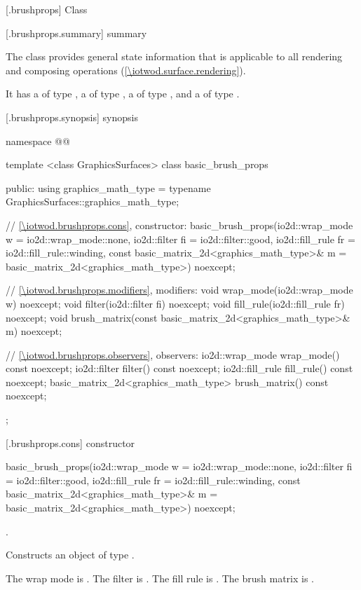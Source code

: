 
 [\iotwod.brushprops] {Class }

 [\iotwod.brushprops.summary] { summary}

\pnum
{}%
The  class provides general state information that is applicable to all rendering and composing operations (\ref{\iotwod.surface.rendering}).

\pnum
It has a  of type , a  of type , a  of type , and a  of type .

 [\iotwod.brushprops.synopsis] { synopsis}

\begin{codeblock}
namespace @\fullnamespace{}@ {
  template <class GraphicsSurfaces>
  class basic_brush_props {
    public:
    using graphics_math_type = typename GraphicsSurfaces::graphics_math_type;

    // \ref{\iotwod.brushprops.cons}, constructor:
    basic_brush_props(io2d::wrap_mode w = io2d::wrap_mode::none,
      io2d::filter fi = io2d::filter::good,
      io2d::fill_rule fr = io2d::fill_rule::winding,
      const basic_matrix_2d<graphics_math_type>& m = basic_matrix_2d<graphics_math_type>{})
      noexcept;

    // \ref{\iotwod.brushprops.modifiers}, modifiers:
    void wrap_mode(io2d::wrap_mode w) noexcept;
    void filter(io2d::filter fi) noexcept;
    void fill_rule(io2d::fill_rule fr) noexcept;
    void brush_matrix(const basic_matrix_2d<graphics_math_type>& m) noexcept;

    // \ref{\iotwod.brushprops.observers}, observers:
    io2d::wrap_mode wrap_mode() const noexcept;
    io2d::filter filter() const noexcept;
    io2d::fill_rule fill_rule() const noexcept;
    basic_matrix_2d<graphics_math_type> brush_matrix() const noexcept;
  };
}
\end{codeblock}

 [\iotwod.brushprops.cons] { constructor}

%
\begin{itemdecl}
basic_brush_props(io2d::wrap_mode w = io2d::wrap_mode::none,
  io2d::filter fi = io2d::filter::good,
  io2d::fill_rule fr = io2d::fill_rule::winding,
  const basic_matrix_2d<graphics_math_type>& m = basic_matrix_2d<graphics_math_type>{})
  noexcept;
\end{itemdecl}
\begin{itemdescr}
\pnum
\requires
{}.

\pnum
\effects
Constructs an object of type .

\pnum
The wrap mode is . The filter is . The fill rule is . The brush matrix is .
\end{itemdescr}

